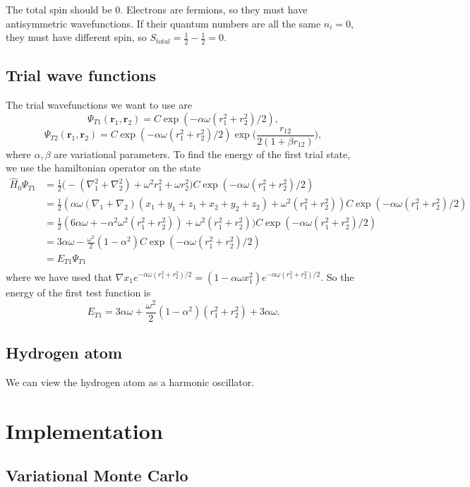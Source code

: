 \documentclass[11pt]{article}
\begin{document}
\begin{flushleft}
The total spin should be $0$. Electrons are fermions, so they must have antisymmetric wavefunctions. If their quantum numbers are all the same $n_i=0$, they must have different spin, so $S_{total} = \frac{1}{2}-\frac{1}{2}=0$.
\end{flushleft}

\pagebreak

\subsection{Trial wave functions}

\begin{flushleft}
The trial wavefunctions we want to use are
\begin{equation}
\Psi_{T1} (\textbf{r}_1, \textbf{r}_2) = C \exp (- \alpha \omega (r_1^2 + r_2^2)/2),
\end{equation}
\begin{equation}
\Psi_{T2}(\textbf{r}_1, \textbf{r}_2) = C \exp (- \alpha \omega (r_1^2+r_2^2)/2) \exp \big( \frac{r_{12}}{2(1+\beta r_{12})} \big),
\end{equation}
where $\alpha, \beta$ are variational parameters. To find the energy of the first trial state, we use the hamiltonian operator on the state
\begin{align*}
\hat{H}_0 \Psi_{T1} &=\frac{1}{2} \big(-(\nabla_1^2 + \nabla_2^2) + \omega^2 r_1^2 + \omega r_2^2 \big) 
C \exp (- \alpha \omega (r_1^2 + r_2^2)/2)\\
&= \frac{1}{2} (\alpha \omega(\nabla_1 + \nabla_2)(x_1 + y_1 + z_1 + x_2 + y_2 + z_2) + \omega^2(r_1^2 + r_2^2))C \exp (- \alpha \omega (r_1^2 + r_2^2)/2)\\
&= \frac{1}{2} (6 \alpha \omega + -\alpha^2 \omega^2 (r_1^2 + r_2^2) ) + \omega^2(r_1^2 + r_2^2))C \exp (- \alpha \omega (r_1^2 + r_2^2)/2)\\
&= 3 \alpha \omega - \frac{\omega^2}{2}(1-\alpha^2) C \exp (- \alpha \omega (r_1^2 + r_2^2)/2)\\
&= E_{T1} \Psi_{T1}\\
\end{align*}
where we have used that $\nabla x_1 e^{- \alpha \omega (r_1^2+r_2^2)/2}= (1 - \alpha \omega x_1^2)e^{- \alpha \omega (r_1^2+r_2^2)/2}$. So the energy of the first test function is 
\begin{equation}
E_{T1} = 3 \alpha \omega + \frac{\omega^2}{2}(1 - \alpha^2)(r_1^2 + r_2^2) + 3 \alpha \omega.
\end{equation}
\end{flushleft}

\subsection{Hydrogen atom}
\begin{flushleft}
We can view the hydrogen atom as a harmonic oscillator.

\end{flushleft}

\section{Implementation}
\subsection{Variational Monte Carlo}
\end{document}

